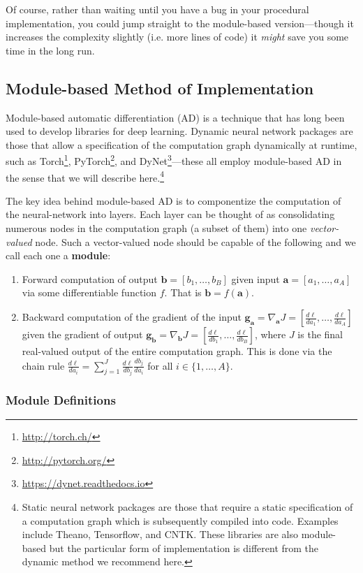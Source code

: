 \documentclass[11pt]{exam}
\numberwithin{equation}{section} %
\numberwithin{figure}{section} %
\numberwithin{table}{section} %
\newcommand{\adj}[1]{\frac{d \ell}{d #1}}
\newcommand{\av}{\mathbf{a}}
\newcommand{\bv}{\mathbf{b}}
\newcommand{\gv}{\mathbf{g}}
\begin{document}
Of course, rather than waiting until you have a bug in your procedural implementation, you could jump straight to the module-based version---though it increases the complexity slightly (i.e. more lines of code) it \emph{might} save you some time in the long run.

\subsection{Module-based Method of Implementation}
\label{sec:modulebased}

Module-based automatic differentiation (AD) is a technique that has long been used to develop libraries for deep learning. Dynamic neural network packages are those that allow a specification of the computation graph dynamically at runtime, such as Torch\footnote{\url{http://torch.ch/}}, PyTorch\footnote{\url{http://pytorch.org/}}, and DyNet\footnote{\url{https://dynet.readthedocs.io}}---these all employ module-based AD in the sense that we will describe here.\footnote{Static neural network packages are those that require a static specification of a computation graph which is subsequently compiled into code. Examples include Theano, Tensorflow, and CNTK. These libraries are also module-based but the particular form of implementation is different from the dynamic method we recommend here.}

The key idea behind module-based AD is to componentize the computation of the neural-network into layers. Each layer can be thought of as consolidating numerous nodes in the computation graph (a subset of them) into one \emph{vector-valued} node. Such a vector-valued node should be capable of the following and we call each one a {\bf module}:
\begin{enumerate}
    \item Forward computation of output $\bv = [b_1, \ldots, b_B]$ given input $\av = [a_1, \ldots, a_A]$ via some differentiable function $f$. That is $\bv = f(\av)$. 
    \item Backward computation of the gradient of the input $\gv_{\av} = \nabla_{\av}J = [\adj{a_1}, \ldots, \adj{a_A}]$ given the gradient of output $\gv_{\bv} = \nabla_{\bv}J = [\adj{b_1}, \ldots, \adj{b_B}]$, where $J$ is the final real-valued output of the entire computation graph. This is done via the chain rule $\adj{a_i} = \sum_{j=1}^J \adj{b_j} \frac{d b_j}{d a_i}$ for all $i \in \{1, \ldots, A\}$.
\end{enumerate}

\subsubsection{Module Definitions}
\end{document}
